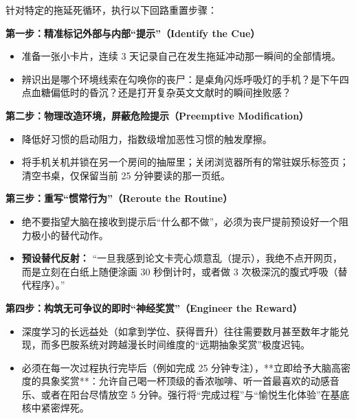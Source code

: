 \documentclass[12pt,a4paper,openany]{ctexbook}
\begin{document}
\begin{practicebox}[重塑拖延回路的四步手术方案]
针对特定的拖延死循环，执行以下回路重置步骤：

\textbf{第一步：精准标记外部与内部“提示”（Identify the Cue）}
\begin{itemize}
    \item 准备一张小卡片，连续 3 天记录自己在发生拖延冲动那一瞬间的全部情境。
    \item 辨识出是哪个环境线索在勾唤你的丧尸：是桌角闪烁呼吸灯的手机？是下午四点血糖偏低时的昏沉？还是打开复杂英文文献时的瞬间挫败感？
\end{itemize}

\textbf{第二步：物理改造环境，屏蔽危险提示（Preemptive Modification）}
\begin{itemize}
    \item 降低好习惯的启动阻力，指数级增加恶性习惯的触发摩擦。
    \item 将手机关机并锁在另一个房间的抽屉里；关闭浏览器所有的常驻娱乐标签页；清空书桌，仅保留当前 25 分钟要读的那一页纸。
\end{itemize}

\textbf{第三步：重写“惯常行为”（Reroute the Routine）}
\begin{itemize}
    \item 绝不要指望大脑在接收到提示后“什么都不做”，必须为丧尸提前预设好一个阻力极小的替代动作。
    \item \textbf{预设替代反射：} “一旦我感到论文卡壳心烦意乱（提示），我绝不点开网页，而是立刻在白纸上随便涂画 30 秒倒计时，或者做 3 次极深沉的腹式呼吸（替代程序）。”
\end{itemize}

\textbf{第四步：构筑无可争议的即时“神经奖赏”（Engineer the Reward）}
\begin{itemize}
    \item 深度学习的长远益处（如拿到学位、获得晋升）往往需要数月甚至数年才能兑现，而多巴胺系统对跨越漫长时间维度的“远期抽象奖赏”极度迟钝。
    \item 必须在每一次过程执行完毕后（例如完成 25 分钟专注），**立即给予大脑高密度的具象奖赏**：允许自己喝一杯顶级的香浓咖啡、听一首最喜欢的动感音乐、或者在阳台尽情放空 5 分钟。强行将“完成过程”与“愉悦生化体验”在基底核中紧密焊死。
\end{itemize}
\end{practicebox}
\end{document}
